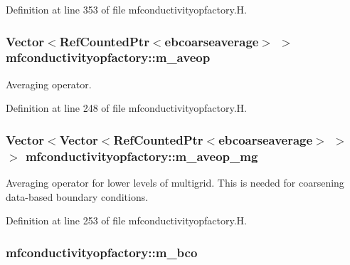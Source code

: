 Definition at line 353 of file mfconductivityopfactory.\+H.

\subsubsection[{\texorpdfstring{m\+\_\+aveop}{m_aveop}}]{\setlength{\rightskip}{0pt plus 5cm}Vector$<$Ref\+Counted\+Ptr$<${\bf ebcoarseaverage}$>$ $>$ mfconductivityopfactory\+::m\+\_\+aveop\hspace{0.3cm}{\ttfamily [protected]}}\hypertarget{classmfconductivityopfactory_a5475e5a9169889861b7cf13d310c8f56}{}\label{classmfconductivityopfactory_a5475e5a9169889861b7cf13d310c8f56}


Averaging operator. 



Definition at line 248 of file mfconductivityopfactory.\+H.

\subsubsection[{\texorpdfstring{m\+\_\+aveop\+\_\+mg}{m_aveop_mg}}]{\setlength{\rightskip}{0pt plus 5cm}Vector$<$Vector$<$Ref\+Counted\+Ptr$<${\bf ebcoarseaverage}$>$ $>$ $>$ mfconductivityopfactory\+::m\+\_\+aveop\+\_\+mg\hspace{0.3cm}{\ttfamily [protected]}}\hypertarget{classmfconductivityopfactory_a460e0030717083a791c637bfb6745af3}{}\label{classmfconductivityopfactory_a460e0030717083a791c637bfb6745af3}


Averaging operator for lower levels of multigrid. This is needed for coarsening data-\/based boundary conditions. 



Definition at line 253 of file mfconductivityopfactory.\+H.

\subsubsection[{\texorpdfstring{m\+\_\+bco}{m_bco}}]{ mfconductivityopfactory\+::m\+\_\+bco\hspace{0.3cm}{\ttfamily [protected]}}\hypertarget{classmfconductivityopfactory_a31cbe6983aa783e39579604a52a28f2c}{}\label{classmfconductivityopfactory_a31cbe6983aa783e39579604a52a28f2c}


